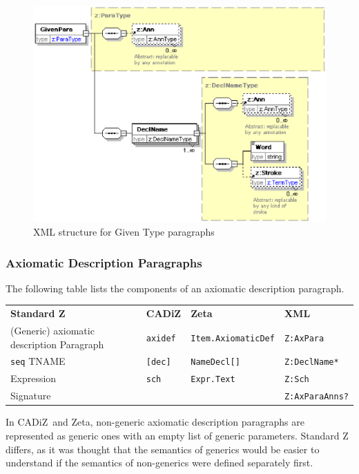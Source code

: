 \documentclass{llncs}  %
\newcommand{\AFont}[1]{\texttt{#1}}
\newcommand{\CADiZ}{CADiZ}
\newcommand{\Zeta}{Zeta}
\newcommand{\AParagraph}{Paragraph}
\newcommand{\AExpression}{Expression}
\newcommand{\TNAME}{TNAME}
\newcommand{\ASignature}{Signature}
\begin{document}
\begin{figure}[htbp]
  \centering
  \includegraphics[width=\textwidth]{givenpara.eps}
  \caption{XML structure for Given Type paragraphs}
  \label{fig:givenpara}
\end{figure}


\subsubsection{Axiomatic Description Paragraphs}

The following table lists the components of an axiomatic description paragraph.

\begin{center}
\begin{tabular}{|l|l|l|l|}
\hline
{\bf Standard Z} & {\bf \CADiZ} & {\bf \Zeta} & {\bf XML}\\
(Generic) axiomatic description \AParagraph & \AFont{axidef} & \AFont{Item.AxiomaticDef} & \AFont{Z:AxPara}\\
\hline
\AFont{seq} \TNAME & \AFont{[dec]} & \AFont{NameDecl[]} & \AFont{Z:DeclName*}\\
\AExpression & \AFont{sch} & \AFont{Expr.Text} & \AFont{Z:Sch}\\
\ASignature & & & \AFont{Z:AxParaAnns?}\\
\hline
\end{tabular}
\end{center}

In \CADiZ\ and \Zeta,
non-generic axiomatic description paragraphs are represented
as generic ones with an empty list of generic parameters.
Standard Z differs, as it was thought that the semantics of generics
would be easier to understand if the semantics of non-generics
were defined separately first.
\end{document}

